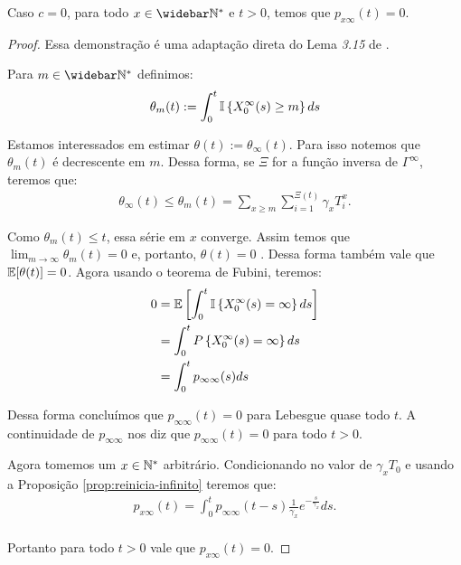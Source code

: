 \begin{proposicao}
  \label{prop:naocontinuidade}
  Caso $c = 0$, para todo $x \in \Nzb$ e $t > 0$, temos que $p_{x
    \infty} (t) = 0$.
\end{proposicao}
\begin{proof}
  Essa demonstração é uma adaptação direta do Lema \emph{3.15} de
  \cite{fontes:08}.

  Para $m \in \Nzb$  definimos:
  \begin{align*}
    \theta_m(t) := \int_0^t {\mathbb{I}} \left\{ X^\infty_0(s) \geq m \right\} ds
  \end{align*}

  Estamos interessados em estimar $\theta(t) :=
  \theta_\infty(t)$. Para isso notemos que $\theta_m(t)$ é decrescente em
  $m$. Dessa forma, se $\Xi$ for a função inversa de $\Gamma^\infty$, teremos
  que:
  \begin{align*}
    \theta_\infty(t) \leq \theta_m(t) = \sum_{x \geq m}
    \sum_{i=1}^{\Xi(t)} \gamma_x T^x_i.
  \end{align*}


  Como $\theta_m(t) \leq t$, essa série em $x$ converge. Assim temos
  que $\lim_{m\to\infty} \theta_m(t) = 0$ \qc e, portanto, $\theta(t) =
  0$ \qc. Dessa forma também vale que ${\mathbb{E}}[\theta(t)] = 0$. Agora
  usando o teorema de Fubini, teremos:
  \begin{align*}
    0 &= {\mathbb{E}}\left[ \int_0^t {\mathbb{I}} \left\{ X^\infty_0(s) = \infty
      \right\} ds \right]\\
    &= \int_0^t P \left\{ X^\infty_0(s) = \infty
    \right\} ds\\
    &= \int_0^t p_{\infty \infty} (s) ds
  \end{align*}

  Dessa forma concluímos que $p_{\infty \infty} (t) = 0$ para Lebesgue
  quase todo $t$. A continuidade de $p_{\infty \infty}$ nos diz que
  $p_{\infty \infty}(t) = 0$ para todo $t > 0$.

  Agora tomemos um $x \in {\mathbb{N^*}}$ arbitrário. Condicionando no valor de
  $\gamma_x T_0$ e usando a Proposição \ref{prop:reinicia-infinito}
  teremos que:
  \begin{align*}
    p_{x \infty} (t) = \int_0^t p_{\infty \infty} (t-s)
    \frac{1}{\gamma_x}e^{-\frac{s}{\gamma_x}} ds.\\
  \end{align*}

  Portanto para todo $t > 0$ vale que $p_{x \infty} (t) = 0$.


\end{proof}


